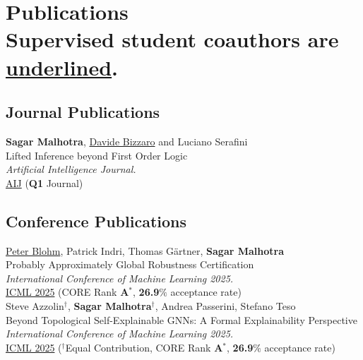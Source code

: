 \documentclass[10pt, a4paper]{article}
\newcommand{\years}[1]{\marginnote{\scriptsize #1}}
\begin{document}
\section*{%
Publications\\[-.4em]%
  {\small Supervised student coauthors are \uline{underlined}.}%
}
\vspace*{-0.5em}

\subsection*{Journal Publications}
\years{2025}\textbf{Sagar Malhotra}, \underline{Davide Bizzaro} and Luciano Serafini\\
Lifted Inference beyond First Order Logic \\
\emph{Artificial Intelligence Journal.}\\
\href{https://doi.org/10.1016/j.artint.2025.104310}{AIJ} (\textbf{Q1} Journal)
\vspace*{-0.5em}

\subsection*{Conference Publications}
\years{2025}\underline{Peter Blohm}, Patrick Indri, Thomas Gärtner, \textbf{Sagar Malhotra}\\ 
Probably Approximately Global Robustness Certification\\
\emph{International Conference of Machine Learning 2025.} \\
\href{https://openreview.net/forum?id=UKHlXpiFMy}{ICML 2025} (CORE Rank \textbf{A$^{*}$}, \textbf{26.9$\%$} acceptance rate) \\   

\years{2025} Steve Azzolin$^{\dagger}$, \textbf{Sagar Malhotra}$^{\dagger}$, Andrea Passerini, Stefano Teso \\
Beyond Topological Self-Explainable GNNs: A Formal Explainability Perspective\\
\emph{International Conference of Machine Learning 2025.}\\
\href{https://openreview.net/forum?id=mkqcUWBykZ}{ICML 2025} ($^{\dagger}$Equal Contribution, CORE Rank \textbf{A$^{*}$}, \textbf{26.9$\%$} acceptance rate)\\ 
\end{document}
